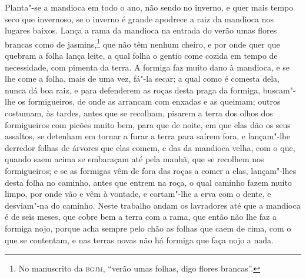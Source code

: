 \begin{linenumbers}
Planta"-se a mandioca em todo o ano, não sendo no inverno, e quer mais tempo seco que
invernoso, se o inverno é grande apodrece a raiz da mandioca nos lugares baixos. Lança a
rama da mandioca na entrada do verão umas flores brancas como de jasmins,\footnote{ No
manuscrito da \textsc{bgjm}, ``verão umas folhas, digo flores brancas''.} que não têm
nenhum cheiro, e por onde quer que quebram a folha lança leite, a qual folha o gentio come
cozida em tempo de necessidade, com pimenta da terra. A formiga faz muito dano à mandioca,
e se lhe come a folha, mais de uma vez, fá"-la secar; a qual como é comesta dela, nunca dá
boa raiz, e para defenderem as roças desta praga da formiga, buscam"-lhe os formigueiros,
de onde as arrancam com enxadas e as queimam; outros costumam, às tardes, antes que se
recolham, pisarem a terra dos olhos dos formigueiros com picões muito bem, para que de
noite, em que elas dão os seus assaltos, se detenham em tornar a furar a terra para saírem
fora, e lançam"-lhe derredor folhas de árvores que elas comem, e das da mandioca velha, com
o que, quando saem acima se embaraçam até pela manhã, que se recolhem nos formigueiros; e
se as formigas vêm de fora das roças a comer a elas, lançam"-lhes desta folha no caminho,
antes que entrem na roça, o qual caminho fazem muito limpo, por onde vão e vêm à vontade,
e cortam"-lhe a erva com o dente, e desviam"-na do caminho. Neste trabalho andam os
lavradores até que a mandioca é de seis meses, que cobre bem a terra com a rama, que então
não lhe faz a formiga nojo, porque acha sempre pelo chão as folhas que caem de cima, com o
que se contentam, e nas terras novas não há formiga que faça nojo a nada.


\end{linenumbers}
